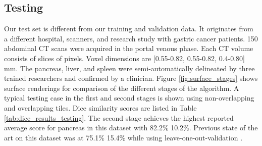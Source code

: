 \documentclass[authoryear]{elsarticle}
\begin{document}
\subsection{Testing} 
Our test set is different from our training and validation data. It originates from a different hospital, scanners, and research study with gastric cancer patients. 150 abdominal CT scans were acquired in the portal venous phase. Each CT volume consists of  slices of  pixels. Voxel dimensions are [0.55-0.82, 0.55-0.82, 0.4-0.80] mm. The pancreas, liver, and spleen were semi-automatically delineated by three trained researchers and confirmed by a clinician. Figure \ref{fig:surface_stages} shows surface renderings for comparison of the different stages of the algorithm. A typical testing case in the first and second stages is shown using non-overlapping and overlapping tiles. Dice similarity scores are listed in Table \ref{tab:dice_results_testing}. The second stage achieves the highest reported average score for pancreas in this dataset with 82.2\% 10.2\%. Previous state of the art on this dataset was at 75.1\% 15.4\% while using leave-one-out-validation \citep{oda2016regression}.
\end{document}
